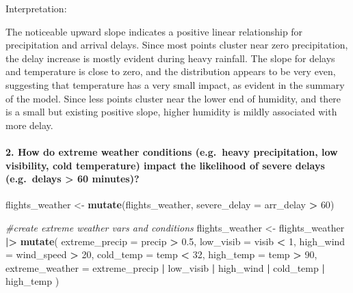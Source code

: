 \documentclass[
]{article}
\newenvironment{Shaded}{\begin{snugshade}}{\end{snugshade}}
\newcommand{\AttributeTok}[1]{\textcolor[rgb]{0.13,0.29,0.53}{#1}}
\newcommand{\CommentTok}[1]{\textcolor[rgb]{0.56,0.35,0.01}{\textit{#1}}}
\newcommand{\DecValTok}[1]{\textcolor[rgb]{0.00,0.00,0.81}{#1}}
\newcommand{\FloatTok}[1]{\textcolor[rgb]{0.00,0.00,0.81}{#1}}
\newcommand{\FunctionTok}[1]{\textcolor[rgb]{0.13,0.29,0.53}{\textbf{#1}}}
\newcommand{\NormalTok}[1]{#1}
\newcommand{\OtherTok}[1]{\textcolor[rgb]{0.56,0.35,0.01}{#1}}
\newcommand{\SpecialCharTok}[1]{\textcolor[rgb]{0.81,0.36,0.00}{\textbf{#1}}}
\begin{document}
Interpretation:

The noticeable upward slope indicates a positive linear relationship for
precipitation and arrival delays. Since most points cluster near zero
precipitation, the delay increase is mostly evident during heavy
rainfall. The slope for delays and temperature is close to zero, and the
distribution appears to be very even, suggesting that temperature has a
very small impact, as evident in the summary of the model. Since less
points cluster near the lower end of humidity, and there is a small but
existing positive slope, higher humidity is mildly associated with more
delay.

\paragraph{2. How do extreme weather conditions (e.g.~heavy
precipitation, low visibility, cold temperature) impact the likelihood
of severe delays (e.g.~delays \textgreater{} 60
minutes)?~}\label{how-do-extreme-weather-conditions-e.g.-heavy-precipitation-low-visibility-cold-temperature-impact-the-likelihood-of-severe-delays-e.g.-delays-60-minutes}

\begin{Shaded}
\begin{Highlighting}[]
\NormalTok{flights\_weather }\OtherTok{\textless{}{-}} \FunctionTok{mutate}\NormalTok{(flights\_weather, }\AttributeTok{severe\_delay =}\NormalTok{ arr\_delay }\SpecialCharTok{\textgreater{}} \DecValTok{60}\NormalTok{)}

\CommentTok{\#create extreme weather vars and conditions}
\NormalTok{flights\_weather }\OtherTok{\textless{}{-}}\NormalTok{ flights\_weather }\SpecialCharTok{|\textgreater{}}
  \FunctionTok{mutate}\NormalTok{(}
    \AttributeTok{extreme\_precip =}\NormalTok{ precip }\SpecialCharTok{\textgreater{}} \FloatTok{0.5}\NormalTok{,}
    \AttributeTok{low\_visib =}\NormalTok{ visib }\SpecialCharTok{\textless{}} \DecValTok{1}\NormalTok{,}
    \AttributeTok{high\_wind =}\NormalTok{ wind\_speed }\SpecialCharTok{\textgreater{}} \DecValTok{20}\NormalTok{,}
    \AttributeTok{cold\_temp =}\NormalTok{ temp }\SpecialCharTok{\textless{}} \DecValTok{32}\NormalTok{,}
    \AttributeTok{high\_temp =}\NormalTok{ temp }\SpecialCharTok{\textgreater{}} \DecValTok{90}\NormalTok{,}
    \AttributeTok{extreme\_weather =}\NormalTok{ extreme\_precip }\SpecialCharTok{|}\NormalTok{ low\_visib }\SpecialCharTok{|}\NormalTok{ high\_wind }\SpecialCharTok{|}\NormalTok{ cold\_temp }\SpecialCharTok{|}\NormalTok{ high\_temp}
\NormalTok{  )}
\end{Highlighting}
\end{Shaded}
\end{document}
